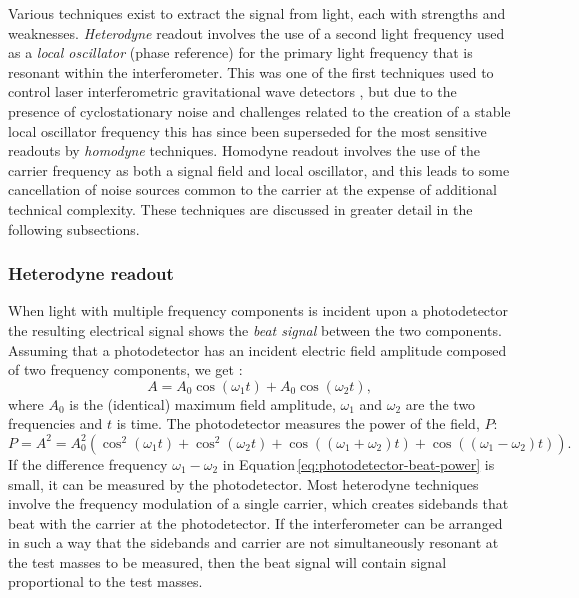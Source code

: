 Various techniques exist to extract the signal from light, each with strengths and weaknesses. \emph{Heterodyne} readout involves the use of a second light frequency used as a \emph{local oscillator} (phase reference) for the primary light frequency that is resonant within the interferometer. This was one of the first techniques used to control laser interferometric gravitational wave detectors \cite{Willke2002}, but due to the presence of cyclostationary noise \cite{Niebauer1991} and challenges related to the creation of a stable local oscillator frequency this has since been superseded for the most sensitive readouts by \emph{homodyne} techniques. Homodyne readout involves the use of the carrier frequency as both a signal field and local oscillator, and this leads to some cancellation of noise sources common to the carrier at the expense of additional technical complexity. These techniques are discussed in greater detail in the following subsections.

\subsubsection{Heterodyne readout}
When light with multiple frequency components is incident upon a photodetector the resulting electrical signal shows the \emph{beat signal} between the two components. Assuming that a photodetector has an incident electric field amplitude composed of two frequency components, we get \cite{Freise2010}:
\begin{equation}
  A = A_0 \cos \left( \omega_1 t \right) + A_0 \cos \left( \omega_2 t \right),
\end{equation}
where $A_0$ is the (identical) maximum field amplitude, $\omega_1$ and $\omega_2$ are the two frequencies and $t$ is time. The photodetector measures the power of the field, $P$:
\begin{equation}
  \label{eq:photodetector-beat-power}
  P = A^2 = A_0^2 \left( \cos^2 \left( \omega_1 t \right) + \cos^2 \left( \omega_2 t \right) + \cos \left( \left( \omega_1 + \omega_2 \right) t \right) + \cos \left( \left( \omega_1 - \omega_2 \right) t \right) \right).
\end{equation}
If the difference frequency $\omega_1 - \omega_2$ in Equation\,\ref{eq:photodetector-beat-power} is small, it can be measured by the photodetector. Most heterodyne techniques involve the frequency modulation of a single carrier, which creates sidebands that beat with the carrier at the photodetector. If the interferometer can be arranged in such a way that the sidebands and carrier are not simultaneously resonant at the test masses to be measured, then the beat signal will contain signal proportional to the test masses.


